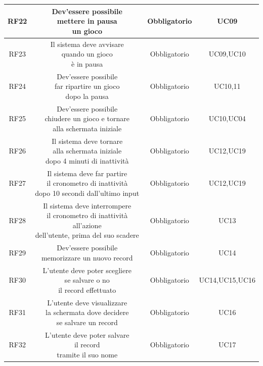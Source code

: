 \begin{longtable}{|c|c|c|c|}
    \hline
    RF22&\makecell{Dev'essere possibile \\ mettere in pausa \\ un gioco}&Obbligatorio&UC09\\
    \hline
    RF23&\makecell{Il sistema deve avvisare \\ quando un gioco \\ è in pausa}&Obbligatorio&UC09,UC10\\
    \hline
    RF24&\makecell{Dev'essere possibile \\ far ripartire un gioco \\ dopo la pausa}&Obbligatorio&UC10,11\\
    \hline
    RF25&\makecell{Dev'essere possibile \\ chiudere un gioco e tornare \\ alla schermata iniziale}&Obbligatorio&UC10,UC04\\
    \hline
    RF26&\makecell{Il sistema deve tornare \\ alla schermata iniziale \\ dopo 4 minuti di inattività}&Obbligatorio&UC12,UC19\\
    \hline
    RF27&\makecell{Il sistema deve far partire \\ il cronometro di inattività \\ dopo 10 secondi dall'ultimo input}&Obbligatorio&UC12,UC19\\
    \hline
    RF28&\makecell{Il sistema deve interrompere \\ il cronometro di inattività all'azione \\ dell'utente, prima del suo scadere}&Obbligatorio&UC13\\
    \hline
    RF29&\makecell{Dev'essere possibile \\ memorizzare un nuovo record}&Obbligatorio&UC14\\
    \hline
    RF30&\makecell{L'utente deve poter scegliere \\ se salvare o no \\ il record effettuato}&Obbligatorio&UC14,UC15,UC16\\
    \hline
    RF31&\makecell{L'utente deve visualizzare \\ la schermata dove decidere \\ se salvare un record}&Obbligatorio&UC16\\
    \hline
    RF32&\makecell{L'utente deve poter salvare \\ il record \\ tramite il suo nome}&Obbligatorio&UC17\\

\end{longtable}
